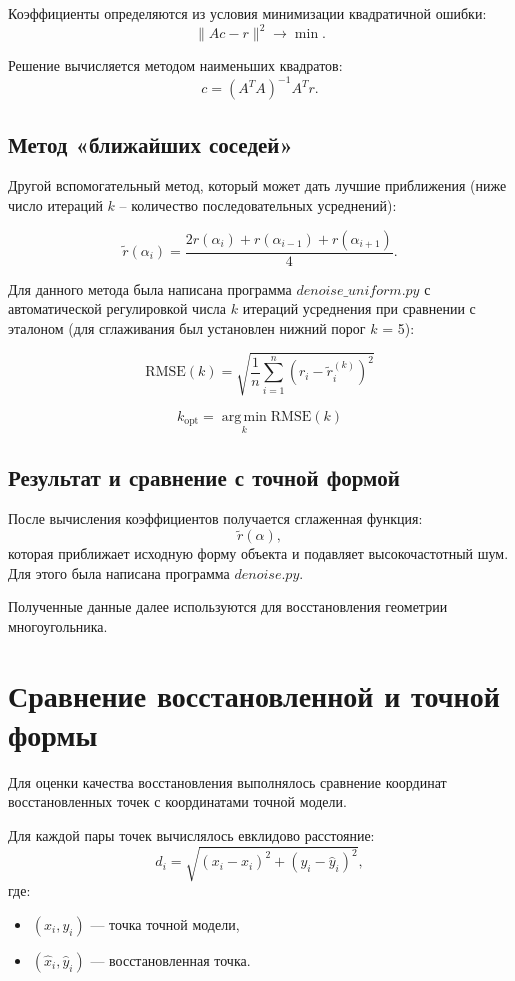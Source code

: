 \documentclass[12pt, a4paper]{article}
\begin{document}
Коэффициенты определяются из условия минимизации квадратичной ошибки:
\[
\|Ac-r\|^2 \rightarrow \min.
\]

Решение вычисляется методом наименьших квадратов:
\[
c = (A^T A)^{-1} A^T r.
\]

\subsection{Метод «ближайших соседей»}

Другой вспомогательный метод, который может дать лучшие приближения (ниже число итераций $k$ -- количество последовательных усреднений):

\[
\widetilde r(\alpha_i) = \frac{2r(\alpha_{i})+r(\alpha_{i-1})+r(\alpha_{i+1})}{4}.
\]

Для данного метода была написана программа $denoise\_uniform.py$ с автоматической регулировкой числа $k$ итераций усреднения при сравнении с эталоном (для сглаживания был установлен нижний порог $k$ = 5):

\[
\mathrm{RMSE}(k)
=
\sqrt{
\frac{1}{n}
\sum_{i=1}^{n}
\left(
r_i - \widetilde r_i^{(k)}
\right)^2
}
\]

\[
k_{\mathrm{opt}} =
\operatorname*{arg\,min}_{k} \mathrm{RMSE}(k)
\]

\subsection{Результат и сравнение с точной формой}

После вычисления коэффициентов получается сглаженная функция:
\[
\widetilde r(\alpha),
\]
которая приближает исходную форму объекта и подавляет высокочастотный шум. Для этого была написана программа $denoise.py$.

Полученные данные далее используются для восстановления геометрии многоугольника.

\clearpage
\section{Сравнение восстановленной и точной формы}

Для оценки качества восстановления выполнялось сравнение координат восстановленных точек с координатами точной модели.

Для каждой пары точек вычислялось евклидово расстояние:
\[
d_i =
\sqrt{
(x_i - \hat{x}_i)^2 +
(y_i - \hat{y}_i)^2
},
\]
где:
\begin{itemize}
    \item $(x_i,y_i)$ — точка точной модели,
    \item $(\hat{x}_i,\hat{y}_i)$ — восстановленная точка.
\end{itemize}
\end{document}
